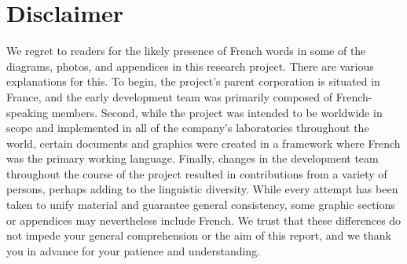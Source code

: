 \chapter*{Disclaimer}
We regret to readers for the likely presence of French words in some of the diagrams, photos, and appendices in this research project. There are various explanations for this. To begin, the project's parent corporation is situated in France, and the early development team was primarily composed of French-speaking members. Second, while the project was intended to be worldwide in scope and implemented in all of the company's laboratories throughout the world, certain documents and graphics were created in a framework where French was the primary working language. Finally, changes in the development team throughout the course of the project resulted in contributions from a variety of persons, perhaps adding to the linguistic diversity.
While every attempt has been taken to unify material and guarantee general consistency, some graphic sections or appendices may nevertheless include French. We trust that these differences do not impede your general comprehension or the aim of this report, and we thank you in advance for your patience and understanding.


\vspace{2cm}
